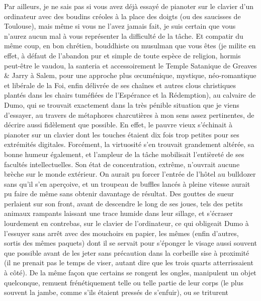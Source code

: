 Par ailleurs, je ne sais pas si vous avez déjà essayé de pianoter sur le clavier d’un ordinateur avec des boudins créoles à la place des doigts (ou des saucisses de Toulouse), mais même si vous ne l’avez jamais fait, je suis certain que vous n’aurez aucun mal à vous représenter la difficulté de la tâche. Et compatir du même coup, en bon chrétien, bouddhiste ou musulman que vous êtes (je milite en effet, à défaut de l’abandon pur et simple de toute espèce de religion, hormis peut-être le vaudou, la santeria et accessoirement le Temple Satanique de Greaves \& Jarry à Salem, pour une approche plus œcuménique, mystique, néo-romantique et libérale de la Foi, enfin délivrée de ses chaînes et autres clous christiques plantés dans les chairs tuméfiées de l’Espérance et la Rédemption), au calvaire de Dumo, qui se trouvait exactement dans la très pénible situation que je viens d’essayer, au travers de métaphores charcutières à mon sens assez pertinentes, de décrire aussi fidèlement que possible. En effet, le pauvre vieux s’échinait à pianoter sur un clavier dont les touches étaient dix fois trop petites pour ses extrémités digitales. Forcément, la virtuosité s’en trouvait grandement altérée, sa bonne humeur également, et l’ampleur de la tâche mobilisait l’entièreté de ses facultés intellectuelles. Son état de concentration, extrême, n’ouvrait aucune brèche sur le monde extérieur. On aurait pu forcer l’entrée de l’hôtel au bulldozer sans qu’il s’en aperçoive, et un troupeau de buffles lancés à pleine vitesse aurait pu faire de même sans obtenir davantage de résultat. Des gouttes de sueur perlaient sur son front, avant de descendre le long de ses joues, tels des petits animaux rampants laissant une trace humide dans leur sillage, et s’écraser lourdement en contrebas, sur le clavier de l’ordinateur, ce qui obligeait Dumo à l’essuyer sans arrêt avec des mouchoirs en papier, les mêmes (enfin d’autres, sortis des mêmes paquets) dont il se servait pour s’éponger le visage aussi souvent que possible avant de les jeter sans précaution dans la corbeille sise à proximité (il ne prenait pas le temps de viser, autant dire que les trois quarts atterrissaient à côté). De la même façon que certains se rongent les ongles, manipulent un objet quelconque, remuent frénétiquement telle ou telle partie de leur corps (le plus souvent la jambe, comme s’ils étaient pressés de s’enfuir), ou se triturent 